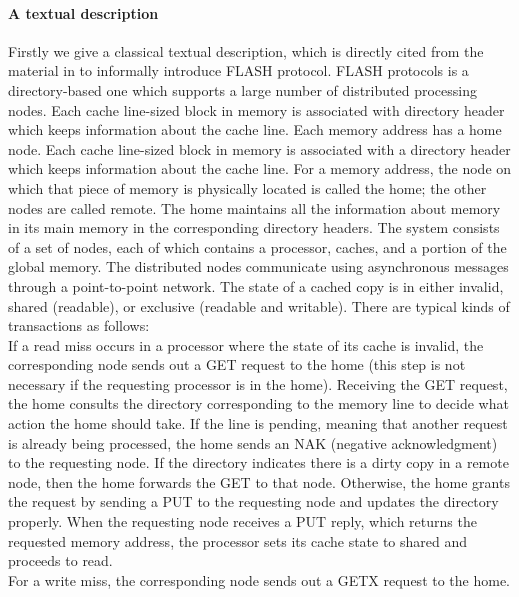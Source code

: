 \documentclass{llncs}
\newcommand{\bedt}[1]{{\color{black}#1}}
\begin{document}
\paragraph*{A textual description}Firstly we give a classical textual description, which is directly cited from the material in \cite{Park2000} to informally introduce FLASH protocol.
FLASH protocols is a directory-based one which supports a large number of distributed processing nodes. Each cache line-sized block in memory is associated with directory header which keeps information about the \bedt{cache} line. Each memory address has a home node. Each cache line-sized block in memory is associated
with a directory header which keeps information about the \bedt{cache} line. For a memory \bedt{address}, the
node on which that piece of memory is physically located is called the home; the other
nodes are called remote. The home maintains all the information about memory in
its main memory in the corresponding directory headers.
The system consists of a set of nodes, each of which contains a processor, caches, and
a portion of the global memory. The distributed nodes communicate using asynchronous
messages through a point-to-point network. The state of a cached copy is in either invalid,
shared (readable), or exclusive (readable and writable). There are typical kinds of transactions as follows:\\%
 If a read miss occurs in a processor where the state of its cache is invalid, the corresponding node sends out a GET request to the
home (this step is not necessary if the requesting processor is in the home). Receiving the
GET request, the home consults the directory corresponding to the memory line to decide
what action the home should take. If the line is pending, meaning that another request
is already being processed, the home sends an NAK (negative acknowledgment) to the
requesting node. If the directory indicates there is a dirty copy in a remote node, then the
home forwards the GET to that node. Otherwise, the home grants the request by sending
a PUT to the requesting node and updates the directory properly. When the requesting
node receives a PUT reply, which returns the requested memory \bedt{address}, the processor sets
its cache state to shared and proceeds to read.\\%
 For a write miss, the corresponding node sends out a GETX request to the home.
\end{document}
